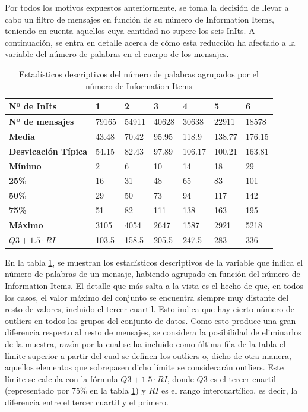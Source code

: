 Por todos los motivos expuestos anteriormente, se toma la decisión de llevar a cabo un filtro de mensajes en función de su número de Information Items, teniendo en cuenta aquellos cuya cantidad no supere los seis InIts. A continuación, se entra en detalle acerca de cómo esta reducción ha afectado a la variable del número de palabras en el cuerpo de los mensajes.

\begin{table}[h]
	\begin{tabular}{|l|l|l|l|l|l|l|}
		\hline
		\textbf{Nº de InIts}        & 1     & 2     & 3     & 4      & 5      & 6      \\ \hline
		\textbf{Nº de mensajes}     & 79165 & 54911 & 40628 & 30638  & 22911  & 18578  \\ \hline
		\textbf{Media}              & 43.48 & 70.42 & 95.95 & 118.9  & 138.77 & 176.15 \\ \hline
		\textbf{Desvicación Típica} & 54.15 & 82.43 & 97.89 & 106.17 & 100.21 & 163.81 \\ \hline
		\textbf{Mínimo}             & 2     & 6     & 10    & 14     & 18     & 29     \\ \hline
		\textbf{25\%}               & 16    & 31    & 48    & 65     & 83     & 101    \\ \hline
		\textbf{50\%}               & 29    & 50    & 73    & 94     & 117    & 142    \\ \hline
		\textbf{75\%}               & 51    & 82    & 111   & 138    & 163    & 195    \\ \hline
		\textbf{Máximo}             & 3105  & 4054  & 2647  & 1587   & 2921   & 5218   \\ \hline
		$Q3 + 1.5\cdot RI$ & 103.5  & 158.5  & 205.5  & 247.5   & 283   & 336   \\ \hline
	\end{tabular}
\caption{Estadísticos descriptivos del número de palabras agrupados por el número de Information Items}\label{tab:statswords}
\end{table}

En la tabla \ref{tab:statswords}, se muestran los estadísticos descriptivos de la variable que indica el número de palabras de un mensaje, habiendo agrupado en función del número de Information Items. El detalle que más salta a la vista es el hecho de que, en todos los casos, el valor máximo del conjunto se encuentra siempre muy distante del resto de valores, incluido el tercer cuartil. Esto indica que hay cierto número de outliers en todos los grupos del conjunto de datos. Como esto produce una gran diferencia respecto al resto de mensajes, se considera la posibilidad de eliminarlos de la muestra, razón por la cual se ha incluido como última fila de la tabla el límite superior a partir del cual se definen los outliers o, dicho de otra manera, aquellos elementos que sobrepasen dicho límite se considerarán outliers. Este límite se calcula con la fórmula $Q3 + 1.5\cdot RI$, donde $Q3$ es el tercer cuartil (representado por 75\% en la tabla \ref{tab:statswords}) y $RI$ es el rango intercuartílico, es decir, la diferencia entre el tercer cuartil y el primero.

